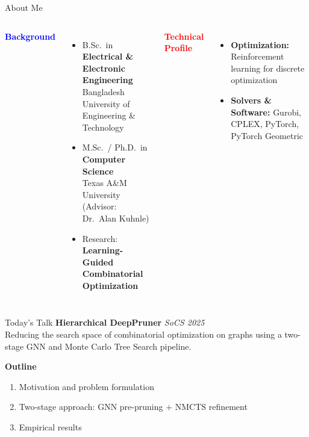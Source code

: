 \documentclass[aspectratio=169,xcolor=dvipsnames]{beamer}
\begin{document}
\begin{frame}[plain]
  \titlepage
\end{frame}

\begin{frame}[plain]{About Me}
\begin{columns}[T,onlytextwidth]
    \textbf{\textcolor{blue}{Background}}
    \begin{itemize}
        \item[\faGraduationCap] B.Sc.\ in \textbf{Electrical \& Electronic Engineering}\\
        {\small Bangladesh University of Engineering \& Technology}
        \item[\faGraduationCap] M.Sc.\ / Ph.D.\ in \textbf{Computer Science}\\
        {\small Texas A\&M University (Advisor: Dr.\ Alan Kuhnle)}
        \item[\faFlask] Research: \textbf{Learning-Guided Combinatorial Optimization}
    \end{itemize}

    \textbf{\textcolor{red}{Technical Profile}}
    \begin{itemize}
        \item[\faCogs] \textbf{Optimization:} Reinforcement learning for discrete optimization
        \item[\faWrench] \textbf{Solvers \& Software:} Gurobi, CPLEX, PyTorch, PyTorch Geometric
    \end{itemize}
\end{columns}
\end{frame}

\begin{frame}[plain]{Today's Talk}
\textbf{Hierarchical DeepPruner} \hfill {\small \textit{SoCS 2025}}\\[0.4cm]

Reducing the search space of combinatorial optimization on graphs using a two-stage GNN and Monte Carlo Tree Search pipeline.

\vspace{0.5cm}
\textbf{Outline}
\begin{enumerate}
    \item Motivation and problem formulation
    \item Two-stage approach: GNN pre-pruning + NMCTS refinement
    \item Empirical results
\end{enumerate}
\end{frame}
\end{document}
